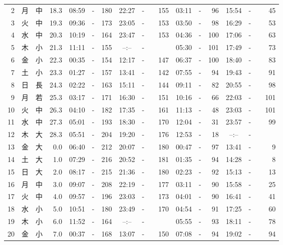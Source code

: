 \documentclass[12pt.a4j]{jsarticle}
\begin{document}
\begin{center}
\begin{table}[ht]
\begin{tabular}{|rc|cr|ccrccr|ccrccr|}
 2 & 月 & 中 & 18.3 &  08:59 &-& 180  &  22:27 &-& 155  &   03:11 &-&  96  &   15:54 &-&  45  \\
 3 & 火 & 中 & 19.3 &  09:36 &-& 173  &  23:05 &-& 153  &   03:50 &-&  98  &   16:29 &-&  53  \\
 4 & 水 & 中 & 20.3 &  10:19 &-& 164  &  23:47 &-& 153  &   04:36 &-& 100  &   17:06 &-&  63  \\
 5 & 木 & 小 & 21.3 &  11:11 &-& 155  &  --:-- &-&~~~~~ &   05:30 &-& 101  &   17:49 &-&  73  \\
 6 & 金 & 小 & 22.3 &  00:35 &-& 154  &  12:17 &-& 147  &   06:37 &-& 100  &   18:40 &-&  83  \\
 7 & 土 & 小 & 23.3 &  01:27 &-& 157  &  13:41 &-& 142  &   07:55 &-&  94  &   19:43 &-&  91  \\
 8 & 日 & 長 & 24.3 &  02:22 &-& 163  &  15:11 &-& 144  &   09:11 &-&  82  &   20:55 &-&  98  \\
 9 & 月 & 若 & 25.3 &  03:17 &-& 171  &  16:30 &-& 151  &   10:16 &-&  66  &   22:03 &-& 101  \\
10 & 火 & 中 & 26.3 &  04:10 &-& 182  &  17:35 &-& 161  &   11:13 &-&  48  &   23:03 &-& 101  \\
11 & 水 & 中 & 27.3 &  05:01 &-& 193  &  18:30 &-& 170  &   12:04 &-&  31  &   23:57 &-&  99  \\
12 & 木 & 大 & 28.3 &  05:51 &-& 204  &  19:20 &-& 176  &   12:53 &-&  18  &   --:-- &-&~~~~~ \\
13 & 金 & 大 &  0.0 &  06:40 &-& 212  &  20:07 &-& 180  &   00:47 &-&  97  &   13:41 &-&   9  \\
14 & 土 & 大 &  1.0 &  07:29 &-& 216  &  20:52 &-& 181  &   01:35 &-&  94  &   14:28 &-&   8  \\
15 & 日 & 大 &  2.0 &  08:17 &-& 215  &  21:36 &-& 180  &   02:23 &-&  92  &   15:13 &-&  13  \\
16 & 月 & 中 &  3.0 &  09:07 &-& 208  &  22:19 &-& 177  &   03:11 &-&  90  &   15:58 &-&  25  \\
17 & 火 & 中 &  4.0 &  09:57 &-& 196  &  23:03 &-& 173  &   04:01 &-&  90  &   16:41 &-&  41  \\
18 & 水 & 小 &  5.0 &  10:51 &-& 180  &  23:49 &-& 170  &   04:54 &-&  91  &   17:25 &-&  60  \\
19 & 木 & 小 &  6.0 &  11:52 &-& 164  &  --:-- &-&~~~~~ &   05:55 &-&  93  &   18:11 &-&  78  \\
20 & 金 & 小 &  7.0 &  00:37 &-& 168  &  13:07 &-& 150  &   07:08 &-&  94  &   19:02 &-&  94  \\

\end{tabular}
\end{table}
\end{center}
\end{document}
